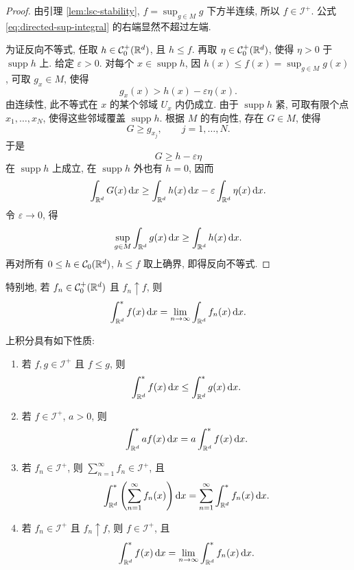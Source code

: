 \begin{proof}
	由引理 \ref{lem:lsc-stability}, \(f=\sup_{g\in M}g\) 下方半连续, 所以 \(f\in\mathcal I^+\). 公式 \eqref{eq:directed-sup-integral} 的右端显然不超过左端.
	
	为证反向不等式, 任取 \(h\in\mathcal{C}_0^+(\mathbb{R}^d)\), 且 \(h\leq f\). 再取 \(\eta\in\mathcal{C}_0^+(\mathbb{R}^d)\), 使得 \(\eta>0\) 于 \(\operatorname{supp}h\) 上. 给定 \(\varepsilon>0\). 对每个 \(x\in\operatorname{supp}h\), 因 \(h(x)\leq f(x)=\sup_{g\in M}g(x)\), 可取 \(g_x\in M\), 使得
	\[
	g_x(x)>h(x)-\varepsilon\eta(x).
	\]
	由连续性, 此不等式在 \(x\) 的某个邻域 \(U_x\) 内仍成立. 由于 \(\operatorname{supp}h\) 紧, 可取有限个点 \(x_1,\ldots,x_N\), 使得这些邻域覆盖 \(\operatorname{supp}h\). 根据 \(M\) 的有向性, 存在 \(G\in M\), 使得
	\[
	G\geq g_{x_j},
	\qquad j=1,\ldots,N.
	\]
	于是
	\[
	G\geq h-\varepsilon\eta
	\]
	在 \(\operatorname{supp}h\) 上成立, 在 \(\operatorname{supp}h\) 外也有 \(h=0\), 因而
	\[
	\int_{\mathbb{R}^d}G(x)\,\dd x
	\geq
	\int_{\mathbb{R}^d}h(x)\,\dd x
	-
	\varepsilon\int_{\mathbb{R}^d}\eta(x)\,\dd x.
	\]
	令 \(\varepsilon\to0\), 得
	\[
	\sup_{g\in M}\int_{\mathbb{R}^d}g(x)\,\dd x
	\geq
	\int_{\mathbb{R}^d}h(x)\,\dd x.
	\]
	再对所有 \(0\leq h\in\mathcal{C}_0(\mathbb{R}^d)\), \(h\leq f\) 取上确界, 即得反向不等式.
\end{proof}

特别地, 若 \(f_n\in\mathcal{C}_0^+(\mathbb{R}^d)\) 且 \(f_n\uparrow f\), 则
\[
\int_{\mathbb{R}^d}^{*}f(x)\,\dd x
=
\lim_{n\to\infty}\int_{\mathbb{R}^d}f_n(x)\,\dd x.
\]

\begin{thm}\label{thm:basic-properties-upper-integral-lsc}
	上积分具有如下性质:
	\begin{enumerate}
		\item 若 \(f,g\in\mathcal I^+\) 且 \(f\leq g\), 则
		\[
		\int_{\mathbb{R}^d}^{*}f(x)\,\dd x
		\leq
		\int_{\mathbb{R}^d}^{*}g(x)\,\dd x.
		\]
		\item 若 \(f\in\mathcal I^+\), \(a>0\), 则
		\[
		\int_{\mathbb{R}^d}^{*}af(x)\,\dd x
		=
		a\int_{\mathbb{R}^d}^{*}f(x)\,\dd x.
		\]
		\item 若 \(f_n\in\mathcal I^+\), 则 \(\sum_{n=1}^{\infty}f_n\in\mathcal I^+\), 且
		\begin{equation}
			\int_{\mathbb{R}^d}^{*}\left(\sum_{n=1}^{\infty}f_n(x)\right)\dd x
			=
			\sum_{n=1}^{\infty}\int_{\mathbb{R}^d}^{*}f_n(x)\,\dd x.
			\label{eq:upper-integral-countable-additivity-lsc}
		\end{equation}
		\item 若 \(f_n\in\mathcal I^+\) 且 \(f_n\uparrow f\), 则 \(f\in\mathcal I^+\), 且
		\begin{equation}
			\int_{\mathbb{R}^d}^{*}f(x)\,\dd x
			=
			\lim_{n\to\infty}\int_{\mathbb{R}^d}^{*}f_n(x)\,\dd x.
			\label{eq:upper-integral-monotone-lsc}
		\end{equation}
	\end{enumerate}
\end{thm}

